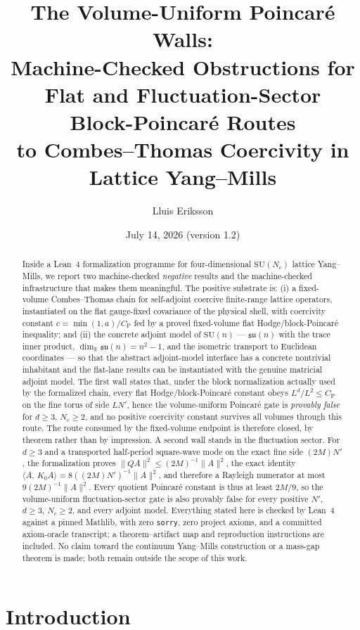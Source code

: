 \documentclass[11pt]{article}
\title{The Volume-Uniform Poincar\'e Walls:\\
Machine-Checked Obstructions for Flat and Fluctuation-Sector\\
Block-Poincar\'e Routes\\
to Combes--Thomas Coercivity in Lattice Yang--Mills}
\author{Lluis Eriksson}
\date{July 14, 2026 (version 1.2)}
\theoremstyle{definition}
\newcommand{\lean}[1]{\texttt{#1}}
\newcommand{\R}{\mathbb{R}}
\newcommand{\SU}{\mathrm{SU}}
\newcommand{\su}{\mathfrak{su}}
\newcommand{\CP}{C_{\mathrm{P}}}
\newcommand{\inn}[2]{\langle #1,\, #2\rangle}
\begin{document}
\maketitle

\begin{abstract}
Inside a Lean~4 formalization programme for four-dimensional $\SU(N_c)$
lattice Yang--Mills, we report two machine-checked \emph{negative}
results and the machine-checked infrastructure that makes them
meaningful.  The positive substrate is: (i) a fixed-volume
Combes--Thomas chain for
self-adjoint coercive finite-range lattice operators, instantiated on the
flat gauge-fixed covariance of the physical shell, with coercivity
constant $c = \min(1,a)/\CP$ fed by a proved fixed-volume flat
Hodge/block-Poincar\'e inequality; and (ii) the concrete adjoint model of
$\SU(n)$ --- $\su(n)$ with the trace inner product,
$\dim_{\R}\su(n)=n^2-1$, and the isometric transport to Euclidean
coordinates --- so that the abstract adjoint-model interface has a
concrete nontrivial inhabitant and the flat-lane results can be
instantiated with the genuine matricial adjoint model.  The first wall
states that, under the block normalization actually used by the
formalized chain, every flat
Hodge/block-Poincar\'e constant obeys $L^d/L^2 \le \CP$ on the fine torus
of side $LN'$, hence the volume-uniform Poincar\'e gate is \emph{provably
false} for $d\ge 3$, $N_c\ge 2$, and no positive coercivity constant
survives all volumes through this route.  The route consumed by the
fixed-volume endpoint is therefore closed, by theorem rather than by
impression.  A second wall stands in the fluctuation sector.  For
$d\ge3$ and a transported half-period square-wave mode on the exact fine
side $(2M)N'$, the formalization proves
$\|QA\|^2\le (2M)^{-1}\|A\|^2$, the exact identity
$\inn{A}{K_0A}=8((2M)N')^{-1}\|A\|^2$, and therefore a Rayleigh numerator
at most $9(2M)^{-1}\|A\|^2$.  Every quotient Poincar\'e constant is thus
at least $2M/9$, so the volume-uniform fluctuation-sector gate is also
provably false for every positive $N'$, $d\ge3$, $N_c\ge2$, and every
adjoint model.  Everything stated here is checked
by Lean~4 against a pinned Mathlib, with zero \lean{sorry}, zero project
axioms, and a committed axiom-oracle transcript; a theorem--artifact map
and reproduction instructions are included.  No claim toward the
continuum Yang--Mills construction or a mass-gap theorem is made; both
remain outside the scope of this work.
\end{abstract}

\section{Introduction}
\end{document}
